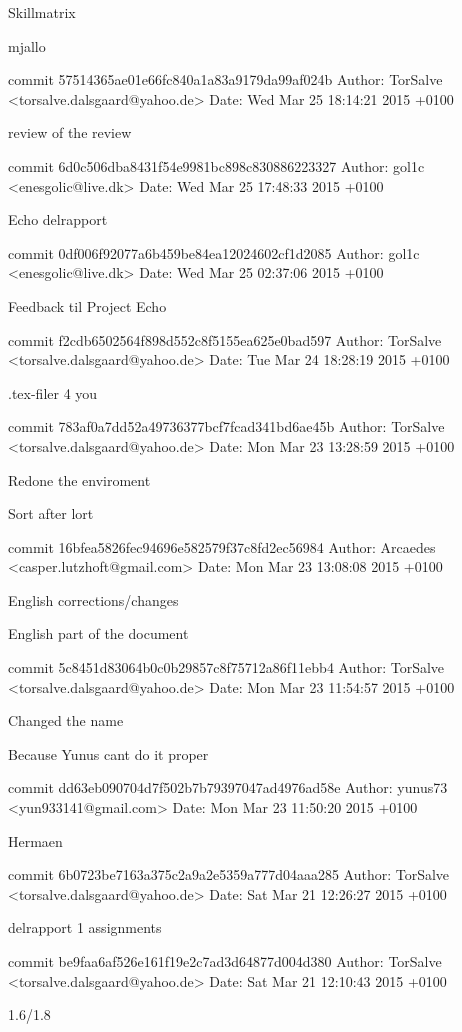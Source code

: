 \documentclass[12pt,a4paper]{article}
\begin{document}
Skillmatrix

mjallo

commit 57514365ae01e66fc840a1a83a9179da99af024b
Author: TorSalve <torsalve.dalsgaard@yahoo.de>
Date:   Wed Mar 25 18:14:21 2015 +0100

review of the review

commit 6d0c506dba8431f54e9981bc898c830886223327
Author: gol1c <enesgolic@live.dk>
Date:   Wed Mar 25 17:48:33 2015 +0100

Echo delrapport

commit 0df006f92077a6b459be84ea12024602cf1d2085
Author: gol1c <enesgolic@live.dk>
Date:   Wed Mar 25 02:37:06 2015 +0100

Feedback til Project Echo

commit f2cdb6502564f898d552c8f5155ea625e0bad597
Author: TorSalve <torsalve.dalsgaard@yahoo.de>
Date:   Tue Mar 24 18:28:19 2015 +0100

.tex-filer 4 you

commit 783af0a7dd52a49736377bcf7fcad341bd6ae45b
Author: TorSalve <torsalve.dalsgaard@yahoo.de>
Date:   Mon Mar 23 13:28:59 2015 +0100

Redone the enviroment

Sort after lort

commit 16bfea5826fec94696e582579f37c8fd2ec56984
Author: Arcaedes <casper.lutzhoft@gmail.com>
Date:   Mon Mar 23 13:08:08 2015 +0100

English corrections/changes

English part of the document

commit 5c8451d83064b0c0b29857c8f75712a86f11ebb4
Author: TorSalve <torsalve.dalsgaard@yahoo.de>
Date:   Mon Mar 23 11:54:57 2015 +0100

Changed the name

Because Yunus cant do it proper

commit dd63eb090704d7f502b7b79397047ad4976ad58e
Author: yunus73 <yun933141@gmail.com>
Date:   Mon Mar 23 11:50:20 2015 +0100

Hermaen

commit 6b0723be7163a375c2a9a2e5359a777d04aaa285
Author: TorSalve <torsalve.dalsgaard@yahoo.de>
Date:   Sat Mar 21 12:26:27 2015 +0100

delrapport 1 assignments

commit be9faa6af526e161f19e2c7ad3d64877d004d380
Author: TorSalve <torsalve.dalsgaard@yahoo.de>
Date:   Sat Mar 21 12:10:43 2015 +0100

1.6/1.8
\end{document}
